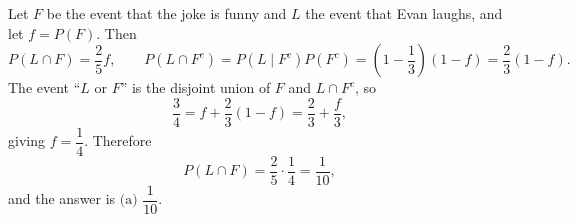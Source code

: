 Let $F$ be the event that the joke is funny and $L$ the event that Evan laughs, and let $f=P(F)$. Then
\[
P(L\cap F)=\dfrac{2}{5} f,\qquad P(L\cap F^c)=P(L\mid F^c)P(F^c)=\left(1-\dfrac{1}{3}\right)(1-f)=\dfrac{2}{3}(1-f).
\]
The event ``$L$ or $F$'' is the disjoint union of $F$ and $L\cap F^c$, so
\[
\dfrac{3}{4}=f+\dfrac{2}{3}(1-f)=\dfrac{2}{3}+\dfrac {f}{3},
\]
giving $f=\dfrac{1}{4}$. Therefore
\[
P(L\cap F)=\dfrac{2}{5}\cdot\dfrac{1}{4}=\dfrac{1}{10},
\]
and the answer is $\boxed{\text{(a) }\dfrac{1}{10}}$.
